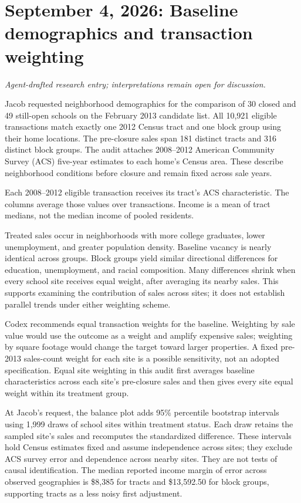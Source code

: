 \section*{September 4, 2026: Baseline demographics and transaction weighting}
\textit{Agent-drafted research entry; interpretations remain open for discussion.}

Jacob requested neighborhood demographics for the comparison of 30 closed
and 49 still-open schools on the February 2013 candidate list. All 10,921
eligible transactions match
exactly one 2012 Census tract and one block group using their home locations.
The pre-closure sales span 181 distinct tracts and 316 distinct block groups.
The audit attaches 2008--2012 American Community Survey (ACS) five-year
estimates to each home's Census area. These describe neighborhood conditions
before closure and remain fixed across sale years.

\begin{center}
\small

\end{center}
{\footnotesize Each 2008--2012 eligible transaction receives its tract's ACS
characteristic. The columns average those values over transactions. Income
is a mean of tract medians, not the median income of pooled residents.}

Treated sales occur in neighborhoods with more college graduates, lower
unemployment, and greater population density. Baseline vacancy is nearly
identical across groups. Block groups yield similar directional differences
for education, unemployment, and racial composition. Many differences shrink
when every school site receives equal weight, after averaging its nearby
sales. This supports examining the contribution of sales across sites; it
does not establish parallel trends under either weighting scheme.

Codex recommends equal transaction weights for the baseline. Weighting by
sale value would use the outcome as a weight and amplify expensive sales;
weighting by square footage would change the target toward larger properties.
A fixed pre-2013 sales-count weight for each site is a possible sensitivity,
not an adopted specification. Equal site weighting in this audit first
averages baseline characteristics across each site's pre-closure sales and
then gives every site equal weight within its treatment group.

At Jacob's request, the balance plot adds 95\% percentile bootstrap intervals
using 1,999 draws of school sites within treatment status. Each draw retains
the sampled site's sales and recomputes the standardized difference. These
intervals hold Census estimates fixed and assume independence across sites;
they exclude ACS survey error and dependence across nearby sites. They are
not tests of causal identification. The median reported income margin of
error across observed geographies is \$8,385 for tracts and \$13,592.50 for
block groups, supporting tracts as a less noisy first adjustment.


